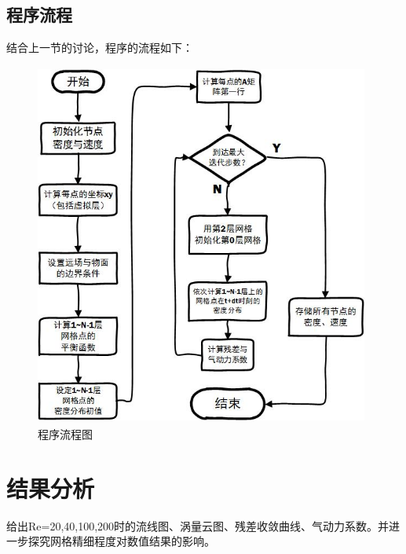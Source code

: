 \documentclass[UTF8]{ctexart}
\begin{document}
\subsection{程序流程}
结合上一节的讨论，程序的流程如下：
\begin{figure}[htbp]\centering
\includegraphics[height=12cm,width=11cm]{../pic/flowchart.jpg}
\caption{程序流程图}
\end{figure}
\clearpage

\section{结果分析}
给出Re=20,40,100,200时的流线图、涡量云图、残差收敛曲线、气动力系数。并进一步探究网格精细程度对数值结果的影响。
\end{document}
